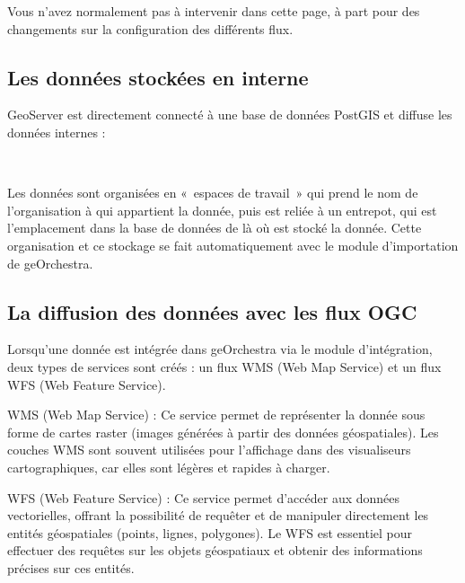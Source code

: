 \documentclass[letterpaper,10pt,french]{sphinxmanual}
\let\sphinxpxdimen\pdfpxdimen\else\newdimen\sphinxpxdimen
\begin{document}
\sphinxAtStartPar
Vous n’avez normalement pas à intervenir dans cette page, à part pour des changements sur la configuration des différents flux.


\subsection{Les données stockées en interne}
\label{\detokenize{doc_admin/services:les-donnees-stockees-en-interne}}
\sphinxAtStartPar
GeoServer est directement connecté à une base de données PostGIS et diffuse les données internes :

\noindent{\hspace*{\fill}\sphinxincludegraphics[width=700\sphinxpxdimen]{{geos_interface}.png}\hspace*{\fill}}

\sphinxAtStartPar
 

\sphinxAtStartPar
Les données sont organisées en « espaces de travail » qui prend le nom de l’organisation à qui appartient la donnée, puis est reliée à un entrepot, qui est l’emplacement
dans la base de données de là où est stocké la donnée. Cette organisation et ce stockage se fait automatiquement avec le module d’importation de geOrchestra.


\subsection{La diffusion des données avec les flux OGC}
\label{\detokenize{doc_admin/services:la-diffusion-des-donnees-avec-les-flux-ogc}}
\sphinxAtStartPar
Lorsqu’une donnée est intégrée dans geOrchestra via le module d’intégration, deux types de services sont créés : un flux WMS (Web Map Service)
et un flux WFS (Web Feature Service).

\sphinxAtStartPar
WMS (Web Map Service) : Ce service permet de représenter la donnée sous forme de cartes raster (images générées à partir des données géospatiales).
Les couches WMS sont souvent utilisées pour l’affichage dans des visualiseurs cartographiques, car elles sont légères et rapides à charger.

\sphinxAtStartPar
WFS (Web Feature Service) : Ce service permet d’accéder aux données vectorielles, offrant la possibilité de requêter et de manipuler directement
les entités géospatiales (points, lignes, polygones). Le WFS est essentiel pour effectuer des requêtes sur les objets géospatiaux et obtenir des informations
précises sur ces entités.
\end{document}
